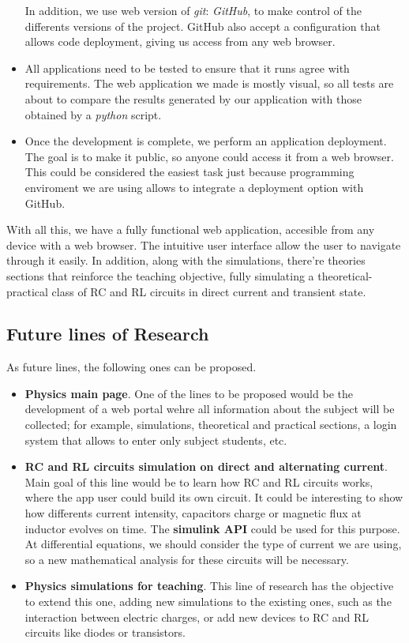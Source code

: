 \documentclass[../main.tex]{subfiles}
\begin{document}
\begin{itemize}
    In addition, we use web version of \textit{git}: \textit{GitHub}, to make control of the differents versions of the project. GitHub also accept a configuration that allows code deployment, giving us access from any web browser.
    
    \item All applications need to be tested to ensure that it runs agree with requirements. The web application we made is mostly visual, so all tests are about to compare the results generated by our application with those obtained by a \textit{python} script.
   
    \item Once the development is complete, we perform an application deployment. The goal is to make it public, so anyone could access it from a web browser. This could be considered the easiest task just because programming enviroment we are using allows to integrate a deployment option with GitHub.
    


\end{itemize}

With all this, we have a fully functional web application, accesible from any device with a web browser. The intuitive user interface allow the user to navigate through it easily. In addition, along with the simulations, there're theories sections that reinforce the teaching objective, fully simulating a theoretical-practical class of RC and RL circuits in direct current and transient state.


\subsection{Future lines of Research}
As future lines, the following ones can be proposed.

\begin{itemize}
    \item \textbf{Physics main page}. One of the lines to be proposed would be the development of a web portal wehre all information about the subject will be collected; for example, simulations, theoretical and practical sections, a login system that allows to enter only subject students, etc.
    
    \item \textbf{RC and RL circuits simulation on direct and alternating current}. Main goal of this line would be to learn how RC and RL circuits works, where the app user could build its own circuit. It could be interesting to show how differents current intensity, capacitors charge or magnetic flux at inductor evolves on time. The \textbf{simulink API} could be used for this purpose. At differential equations, we should consider the type of current we are using, so a new mathematical analysis for these circuits will be necessary. 
    
    \item \textbf{Physics simulations for teaching}. This line of research has the objective to extend this one, adding new simulations to the existing ones, such as the interaction between electric charges, or add new devices to RC and RL circuits like diodes or transistors.
\end{itemize}
\end{document}
